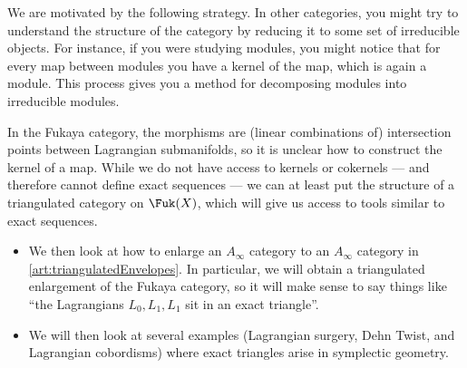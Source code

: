 \begin{exposition}
We are motivated by the following strategy.
In other categories, you might try to understand the structure of the category by reducing it to some set of irreducible objects. For instance, if you were studying modules, you might notice that for every map between modules you have a kernel of the map, which is again a module. This process gives you a method for decomposing modules into irreducible modules. 

In the Fukaya category, the morphisms are (linear combinations of) intersection points between Lagrangian submanifolds, so it is unclear how to construct the kernel of a map.
While we do not have access to kernels or cokernels --- and therefore cannot define exact sequences --- we can at least put the structure of a triangulated category on $\Fuk(X)$, which will give us access to tools similar to exact sequences. 

\begin{itemize}
    \item We then look at how to enlarge an $A_\infty$ category to an $A_\infty$ category in \cref{art:triangulatedEnvelopes}. In particular, we will obtain a triangulated enlargement of the Fukaya category, so it will make sense to say things like ``the Lagrangians $L_0, L_1, L_1$ sit in an exact triangle''.
    \item We will then look at several examples (Lagrangian surgery, Dehn Twist, and Lagrangian cobordisms) where exact triangles arise in symplectic geometry.
\end{itemize}







    \end{exposition}